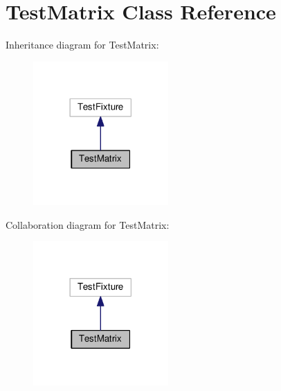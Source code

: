 \hypertarget{class_test_matrix}{}\section{Test\+Matrix Class Reference}
\label{class_test_matrix}


Inheritance diagram for Test\+Matrix\+:
\nopagebreak
\begin{figure}[H]
\begin{center}
\leavevmode
\includegraphics[width=146pt]{class_test_matrix__inherit__graph}
\end{center}
\end{figure}


Collaboration diagram for Test\+Matrix\+:
\nopagebreak
\begin{figure}[H]
\begin{center}
\leavevmode
\includegraphics[width=146pt]{class_test_matrix__coll__graph}
\end{center}
\end{figure}
